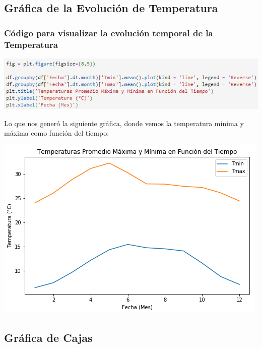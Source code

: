 \documentclass{article}
\begin{document}
\subsection{Gráfica de la Evolución de Temperatura}
\subsubsection{Código para visualizar la evolución temporal de la Temperatura}
\begin{center}
    \includegraphics[scale = 0.9]{CTemp.png}
\end{center}

\clearpage
Lo que nos generó la siguiente gráfica, donde vemos la temperatura mínima y máxima como función del tiempo:
\begin{center}
    \includegraphics[scale = 0.70]{Temp.png}
\end{center}
\subsection{Gráfica de Cajas}
\end{document}

